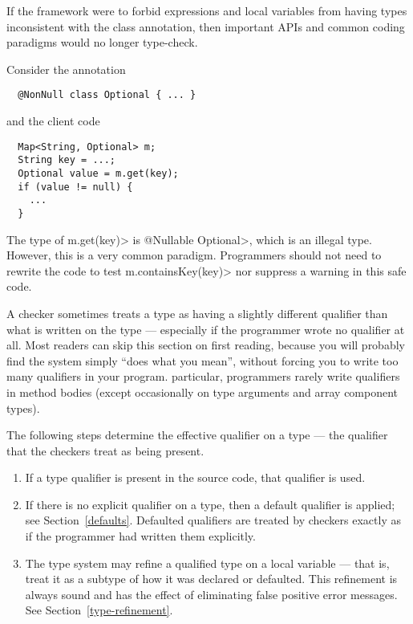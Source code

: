If the framework were to forbid expressions and local variables from having types inconsistent with the class annotation,
then important APIs and common coding paradigms would no longer type-check.

Consider the annotation
\begin{Verbatim}
  @NonNull class Optional { ... }
\end{Verbatim}
and the client code

\begin{Verbatim}
  Map<String, Optional> m;
  String key = ...;
  Optional value = m.get(key);
  if (value != null) {
    ...
  }
\end{Verbatim}

The type of \<m.get(key)> is \<@Nullable Optional>, which is an illegal type.
However, this is a very common paradigm.  Programmers should not need to rewrite the code to test
\<m.containsKey(key)> nor suppress a warning in this safe code.



A checker sometimes treats a type as having a slightly different qualifier
than what is written on the type --- especially if the programmer wrote no
qualifier at all.
Most readers can skip this section on first reading, because you will
probably find the system simply ``does what you mean'', without forcing
you to write too many qualifiers in your program.
particular, programmers rarely write qualifiers in method bodies (except occasionally on
type arguments and array component types).

The following steps determine the effective
qualifier on a type --- the qualifier that the checkers treat as being present.

\begin{enumerate}
\item
  If a type qualifier is present in the source code, that qualifier is used.

\item
  If there is no explicit qualifier on a type, then a default
  qualifier
  is applied; see Section~\ref{defaults}. Defaulted qualifiers are treated by checkers
  exactly as if the programmer had written them explicitly.

\item
  The type system may refine a qualified type on a local variable --- that
  is, treat it as a subtype of how it was declared or defaulted.  This
  refinement is always sound and has the effect of eliminating false
  positive error messages.  See Section~\ref{type-refinement}.

\end{enumerate}

